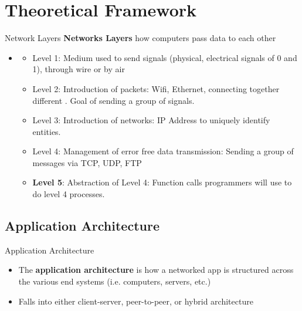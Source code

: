 \documentclass{beamer}
\begin{document}

\section{Theoretical Framework}


        \begin{frame}{Network Layers}
         \textbf{Networks Layers} how computers pass data to each other
        \begin{itemize}
            \item \begin{itemize}
            \item Level 1: Medium used to send signals (physical, electrical signals of 0 and 1), through wire or by air
            \item Level 2: Introduction of packets: Wifi, Ethernet, connecting together different . Goal of sending a group of signals.
            \item Level 3: Introduction of networks: IP Address to uniquely identify entities. 
            \item Level 4: Management of error free data transmission: Sending a group of messages via TCP, UDP, FTP
            \item \textbf{Level 5}: Abstraction of Level 4: Function calls programmers will use to do level 4 processes.
            \end{itemize}
        \end{itemize}
    \end{frame}
    
    \subsection{Application Architecture}

    \begin{frame}{Application Architecture}
        \begin{itemize}
            \item The \textbf{application architecture} is how a networked app is structured across the various end systems (i.e. computers, servers, etc.) \cite{kurose}
            \item Falls into either client-server, peer-to-peer, or hybrid architecture
        \end{itemize}
    \end{frame}
       
\end{document}
